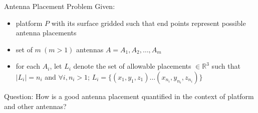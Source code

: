 \documentclass{beamer}
\begin{document}
\begin{frame}[t]{Antenna Placement Problem}
    Given:
\begin{itemize} \itemsep1.5em
        \item platform $P$ with its surface gridded such that end points represent possible antenna placements
        \item set of  $m~(m > 1)$ antennas $A = {A_1, A_2, \dots, A_m}$
        \item for each $A_i$, let $L_i$ denote the set of allowable placements $\in \mathbb R^3$ such that $\mid L_i \mid = n_i$ and $\forall i, n_i > 1$; $L_i = \{(x_{1}, y_{1}, z_{1}) \dots (x_{n_i}, y_{n_i}, z_{n_i})\}$
    \end{itemize}
    \vspace{10px}
    \centering{}
\end{frame}

\begin{frame}{\null}
    \begin{tcolorbox}[colback=green!5]
        \centering
        Question: How is a good antenna placement quantified in the context of platform and other antennas?
    \end{tcolorbox}
\end{frame}
\end{document}
